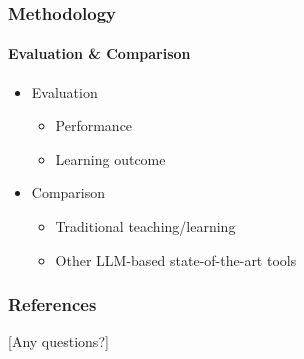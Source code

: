 \begin{contentframe}
    \frametitle{Methodology}
    \framesubtitle{Evaluation \& Comparison}

    \begin{itemize}
        \item Evaluation
        \begin{itemize}
            \item Performance
            \item Learning outcome
        \end{itemize}

        \bigskip
        \item Comparison
        \begin{itemize}
            \item Traditional teaching/learning\cite{geng2023can, ouh2023chatgpt}
            \item Other LLM-based state-of-the-art tools\cite{kuramitsu2023kogi}
        \end{itemize}

        
    \end{itemize}
\end{contentframe}

\begin{bibframe}
    \frametitle{References}
\end{bibframe}

[Any questions?]